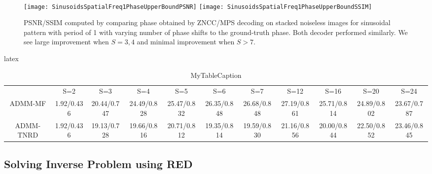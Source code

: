 \documentclass[../writeup.tex]{subfiles}
\begin{document}
\paragraph{}

\begin{figure}[h!]
    \begin{center}
        \texttt{[image: SinusoidsSpatialFreq1PhaseUpperBoundPSNR]}
        \texttt{[image: SinusoidsSpatialFreq1PhaseUpperBoundSSIM]}
        \caption{PSNR/SSIM computed by comparing phase obtained by ZNCC/MPS decoding on stacked noiseless images for sinusoidal pattern with period of 1 with varying number of phase shifts to the ground-truth phase. Both decoder performed similarly. We see large improvement when $S=3,4$ and minimal improvement when $S>7$.}
        \label{fig:sinusiods_spatial_freq_1_phase_upper_bound_wrt_S}
    \end{center}
\end{figure}  
 latex

 \begin{table}
    \centering
    \begin{tabular}{c|cccccccccc}
    \hline
     & S=2 & S=3 & S=4 & S=5 & S=6 & S=7 & S=12 & S=16 & S=20 & S=24 \\
    ADMM-MF & 1.92/0.436 & 20.44/0.747 & 24.49/0.828 & 25.47/0.832 & 26.35/0.848 & 26.68/0.848 & 27.19/0.861 & 25.71/0.814 & 24.89/0.802 & 23.67/0.787 \\
    ADMM-TNRD & 1.92/0.436 & 19.13/0.728 & 19.66/0.816 & 20.71/0.812 & 19.35/0.814 & 19.59/0.830 & 21.16/0.856 & 20.00/0.844 & 22.50/0.852 & 23.46/0.845 \\
    \end{tabular}
    \caption{MyTableCaption}
    \label{table:MyTableLabel}
\end{table}

\subsection{Solving Inverse Problem using RED}
\end{document}
